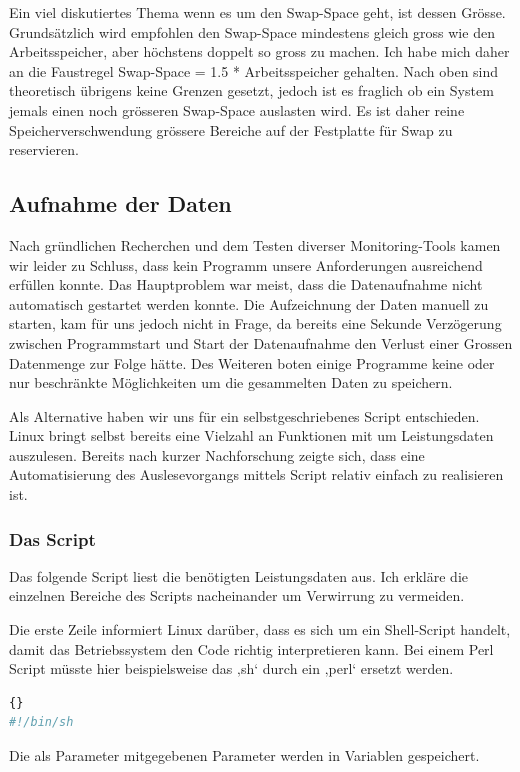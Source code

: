 \documentclass{fancydocument}
\begin{document}
Ein viel diskutiertes Thema wenn es um den Swap-Space geht, ist dessen Grösse. Grundsätzlich wird empfohlen den Swap-Space mindestens gleich gross wie den Arbeitsspeicher, aber höchstens doppelt so gross zu machen. Ich habe mich daher an die Faustregel Swap-Space = 1.5 * Arbeitsspeicher gehalten. Nach oben sind theoretisch übrigens keine Grenzen gesetzt, jedoch ist es fraglich ob ein System jemals einen noch grösseren Swap-Space auslasten wird. Es ist daher reine Speicherverschwendung grössere Bereiche auf der Festplatte für Swap zu reservieren.

\subsection{Aufnahme der Daten}
Nach gründlichen Recherchen und dem Testen diverser Monitoring-Tools kamen wir leider zu Schluss, dass kein Programm unsere Anforderungen ausreichend erfüllen konnte. Das Hauptproblem war meist, dass die Datenaufnahme nicht automatisch gestartet werden konnte. Die Aufzeichnung der Daten manuell zu starten, kam für uns jedoch nicht in Frage, da bereits eine Sekunde Verzögerung zwischen Programmstart und Start der Datenaufnahme den Verlust einer Grossen Datenmenge zur Folge hätte. Des Weiteren boten einige Programme keine oder  nur beschränkte Möglichkeiten um die gesammelten Daten zu speichern.

Als Alternative haben wir uns für ein selbstgeschriebenes Script entschieden. Linux bringt selbst bereits eine Vielzahl an Funktionen mit um Leistungsdaten auszulesen. Bereits nach kurzer Nachforschung zeigte sich, dass eine Automatisierung des Auslesevorgangs mittels Script relativ einfach zu realisieren ist.

\subsubsection{Das Script}
Das folgende Script liest die benötigten Leistungsdaten aus. Ich erkläre die einzelnen Bereiche des Scripts nacheinander um Verwirrung zu vermeiden.

Die erste Zeile informiert Linux darüber, dass es sich um ein Shell-Script handelt, damit das Betriebssystem den Code richtig interpretieren kann. Bei einem Perl Script müsste hier beispielsweise das ‚sh‘ durch ein ‚perl‘ ersetzt werden.

\begin{minipage}{\textwidth}
\begin{lstlisting}[language=bash,caption=Shebang]{}
#!/bin/sh
\end{lstlisting}
\end{minipage}
Die als Parameter mitgegebenen Parameter werden in Variablen gespeichert.
\end{document}
